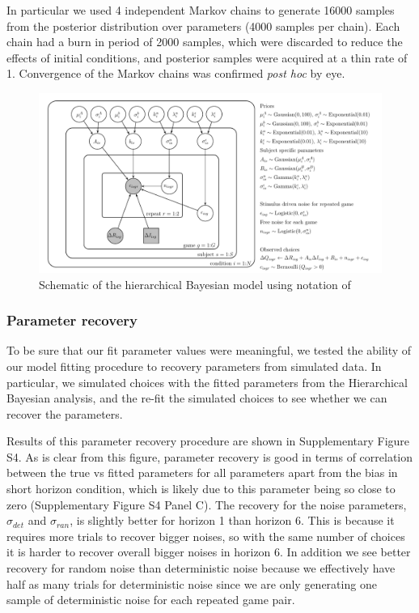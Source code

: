 \documentclass[12pt]{article}
\begin{document}
	In particular we used 4 independent Markov chains to generate 16000 samples from the posterior distribution over parameters (4000 samples per chain).  Each chain had a burn in period of 2000 samples, which were discarded to reduce the effects of initial conditions, and posterior samples were acquired at a thin rate of 1.  Convergence of the Markov chains was confirmed {\it post hoc} by eye. 
	
	\begin{figure}[H]
		\begin{center}
			\includegraphics[width=1\textwidth]{figures/Siyu_EEHorizon_2sigma_final.pdf}
    			\caption{Schematic of the hierarchical Bayesian model using notation of \cite{lee_wagenmakers_2014}}
			\label{fig:model}
		\end{center}
	\end{figure}
	
	\subsubsection*{Parameter recovery\label{ch:appendix:bayesrecovery}}
	
	To be sure that our fit parameter values were meaningful, we tested the ability of our model fitting procedure to recovery parameters from simulated data.  In particular, we simulated choices with the fitted parameters from the Hierarchical Bayesian analysis, and the re-fit the simulated choices to see whether we can recover the parameters. 
	
	Results of this parameter recovery procedure are shown in Supplementary Figure S4. As is clear from this figure, parameter recovery is good in terms of correlation between the true vs fitted parameters for all parameters apart from the bias in short horizon condition, which is likely due to this parameter being so close to zero (Supplementary Figure S4 Panel C). The recovery for the noise parameters, $\sigma_{det}$ and $\sigma_{ran}$, is slightly better for horizon 1 than horizon 6. This is because it requires more trials to recover bigger noises, so with the same number of choices it is harder to recover overall bigger noises in horizon 6. In addition we see better recovery for random noise than deterministic noise because we effectively have half as many trials for deterministic noise since we are only generating one sample of deterministic noise for each repeated game pair. 
	
\end{document}
